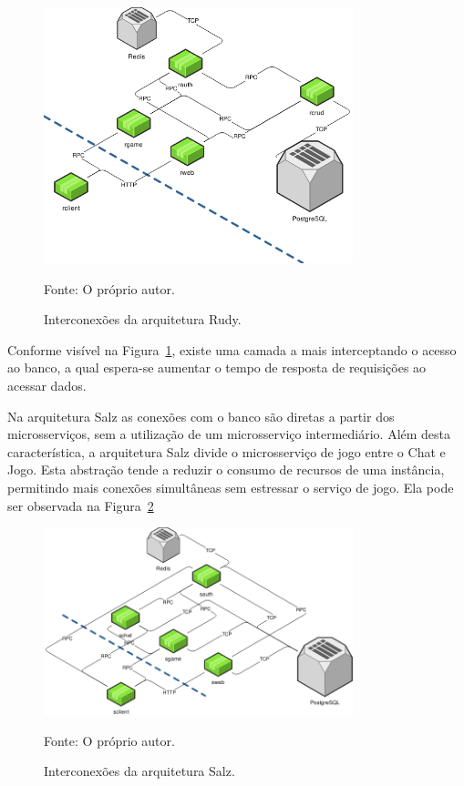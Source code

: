 \begin{figure}[htb!]
  \caption{Interconexões da arquitetura Rudy.}
  \label{fig:interconexao_rudy}
  \includegraphics[width=0.8\textwidth]{figuras/interconexoes/rudy.png}
  \centering

  Fonte: O próprio autor.
\end{figure}



Conforme visível na Figura~\ref{fig:interconexao_rudy}, existe uma camada a mais interceptando o acesso ao banco, a qual espera-se aumentar o tempo de resposta de requisições ao acessar dados.



Na arquitetura Salz as conexões com o banco são diretas a partir dos microsserviços, sem a utilização de um microsserviço intermediário.
%
Além desta característica, a arquitetura Salz divide o microsserviço de jogo entre o Chat e Jogo. Esta abstração tende a reduzir o consumo de recursos de uma instância, permitindo mais conexões simultâneas sem estressar o serviço de jogo.
%
Ela pode ser observada na Figura~\ref{fig:interconexao_salz}



\begin{figure}[htb!]
  \caption{Interconexões da arquitetura Salz.}
  \label{fig:interconexao_salz}
  \includegraphics[width=0.8\textwidth]{figuras/interconexoes/salz.png}
  \centering

  Fonte: O próprio autor.
\end{figure}



